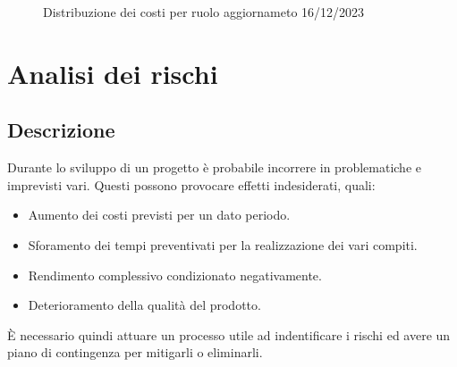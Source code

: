 \documentclass{article}
\begin{document}
    \begin{figure}[h]
        \centering
        \caption{Distribuzione dei costi per ruolo aggiornameto 16/12/2023}
    \end{figure}



\section{Analisi dei rischi}
\subsection{Descrizione}
Durante lo sviluppo di un progetto è probabile incorrere in problematiche e imprevisti vari. Questi possono provocare effetti indesiderati, quali:
\begin{itemize}
    \item Aumento dei costi previsti per un dato periodo.
    \item Sforamento dei tempi preventivati per la realizzazione dei vari compiti.
    \item Rendimento complessivo condizionato negativamente.
    \item Deterioramento della qualità del prodotto.
\end{itemize}
È necessario quindi attuare un processo utile ad indentificare i rischi ed avere un piano di contingenza per mitigarli o eliminarli.

\end{document}

